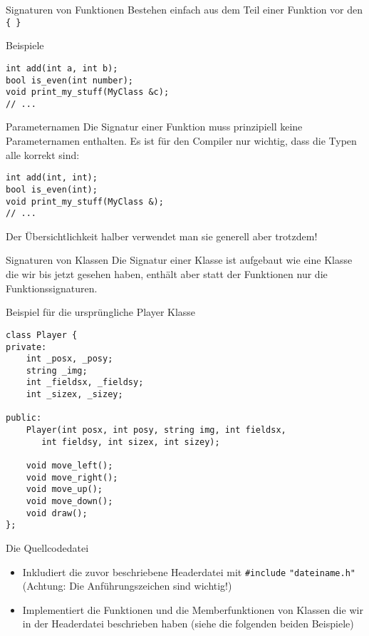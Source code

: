 \documentclass[presentation]{beamer}
\begin{document}
\begin{frame}[label={sec:orga6d932a},fragile]{Signaturen von Funktionen}
 Bestehen einfach aus dem \alert{Teil einer Funktion vor den {\color{solarizedYellow}\texttt{\{ \}}}}
\begin{block}{Beispiele}
\begin{verbatim}
int add(int a, int b);
bool is_even(int number);
void print_my_stuff(MyClass &c);
// ...
\end{verbatim}
\end{block}
\begin{block}{Parameternamen}
Die Signatur einer Funktion muss prinzipiell \alert{keine Parameternamen}
enthalten. Es ist für den Compiler nur wichtig, dass die Typen alle
korrekt sind:
\begin{verbatim}
int add(int, int);
bool is_even(int);
void print_my_stuff(MyClass &);
// ...
\end{verbatim}
Der Übersichtlichkeit halber \alert{verwendet man sie generell aber trotzdem}!
\end{block}
\end{frame}
\begin{frame}[label={sec:org118493e},fragile]{Signaturen von Klassen}
 Die Signatur einer Klasse ist aufgebaut wie eine Klasse die wir bis
jetzt gesehen haben, \alert{enthält aber statt der Funktionen nur die
Funktionssignaturen}.
\begin{block}{Beispiel für die ursprüngliche Player Klasse}
\begin{verbatim}
class Player {
private:
    int _posx, _posy;      
    string _img;           
    int _fieldsx, _fieldsy;
    int _sizex, _sizey;    

public:
    Player(int posx, int posy, string img, int fieldsx,
	   int fieldsy, int sizex, int sizey);

    void move_left();
    void move_right();
    void move_up();
    void move_down();
    void draw();
};
\end{verbatim}
\end{block}
\end{frame}
\begin{frame}[label={sec:org51f9859},fragile]{Die Quellcodedatei}
 \begin{itemize}
\item Inkludiert die zuvor beschriebene Headerdatei mit {\color{solarizedYellow}\verb!#include!
  \verb!"dateiname.h"!} (\alert{Achtung:} Die Anführungszeichen sind wichtig!)
\item Implementiert die Funktionen und die Memberfunktionen von Klassen
die wir in der Headerdatei beschrieben haben (siehe die folgenden
beiden Beispiele)
\end{itemize}
\end{frame}
\end{document}
